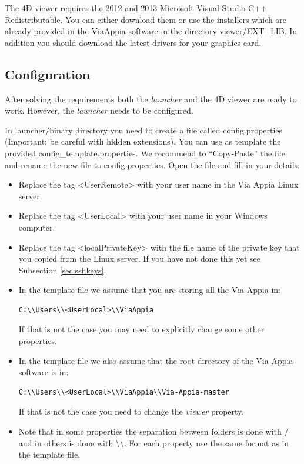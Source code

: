 \documentclass[a4paper,11pt]{article}
\begin{document}
The 4D viewer requires the 2012 and 2013 Microsoft Visual Studio C++ Redistributable. You can either download them or use the installers which are already provided in the ViaAppia software in the directory viewer/EXT\_LIB. In addition you should download the latest drivers for your graphics card.

\subsection{Configuration}

After solving the requirements both the \textit{launcher} and the 4D viewer are ready to work. However, the \textit{launcher} needs to be configured.

In launcher/binary directory you need to create a file called config.properties (Important: be careful with hidden extensions). You can use as template the provided config\_template.properties. We recommend to ``Copy-Paste'' the file and rename the new file to config.properties. Open the file and fill in your details:

\begin{itemize}
\item Replace the tag \textless{}UserRemote\textgreater{} with your user name in the Via Appia Linux server.
\item Replace the tag \textless{}UserLocal\textgreater{} with your user name in your Windows computer.
\item Replace the tag \textless{}localPrivateKey\textgreater{} with the file name of the private key that you copied from the Linux server. If you have not done this yet see Subsection \ref{sec:sshkeys}.
\item In the template file we assume that you are storing all the Via Appia in:
\begin{verbatim}
C:\\Users\\<UserLocal>\\ViaAppia
\end{verbatim}
If that is not the case you may need to explicitly change some other properties.
\item In the template file we also assume that the root directory of the Via Appia software is in:
\begin{verbatim}
C:\\Users\\<UserLocal>\\ViaAppia\\Via-Appia-master
\end{verbatim}
If that is not the case you need to change the \textit{viewer} property.
\item Note that in some properties the separation between folders is done with / and in others is done with \textbackslash{}\textbackslash{}. For each property use the same format as in the template file.
\end{itemize}
\end{document}
